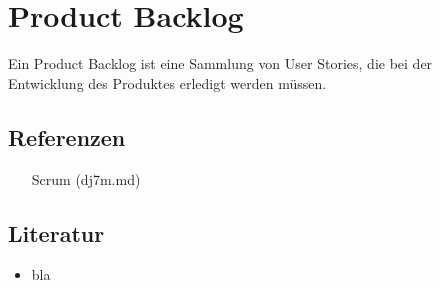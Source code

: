 \documentclass{sajzk}
\begin{document}
\section{Product Backlog} 
\label{0ata}

Ein Product Backlog ist eine Sammlung von User Stories, die bei der Entwicklung
des Produktes erledigt werden müssen.

\subsection{Referenzen} 
\begin{itemize}
  \item [Scrum](dj7m.md)
\end{itemize}

\subsection{Literatur} 

\begin{itemize}
  \item bla
\end{itemize}
\end{document}
